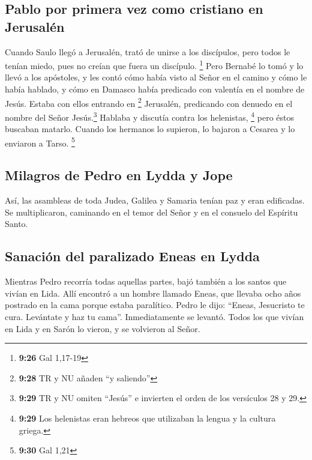 \hypertarget{pablo-por-primera-vez-como-cristiano-en-jerusaluxe9n}{%
\subsection{Pablo por primera vez como cristiano en
Jerusalén}\label{pablo-por-primera-vez-como-cristiano-en-jerusaluxe9n}}

 Cuando Saulo llegó a Jerusalén, trató de unirse a los
discípulos, pero todos le tenían miedo, pues no creían que fuera un
discípulo. \footnote{\textbf{9:26} Gal 1,17-19}  Pero
Bernabé lo tomó y lo llevó a los apóstoles, y les contó cómo había visto
al Señor en el camino y cómo le había hablado, y cómo en Damasco había
predicado con valentía en el nombre de Jesús.  Estaba con
ellos entrando en \footnote{\textbf{9:28} TR y NU añaden ``y saliendo''}
Jerusalén,  predicando con denuedo en el nombre del Señor
Jesús.\footnote{\textbf{9:29} TR y NU omiten ``Jesús'' e invierten el
  orden de los versículos 28 y 29.} Hablaba y discutía contra los
helenistas, \footnote{\textbf{9:29} Los helenistas eran hebreos que
  utilizaban la lengua y la cultura griega.} pero éstos buscaban
matarlo.  Cuando los hermanos lo supieron, lo bajaron a
Cesarea y lo enviaron a Tarso. \footnote{\textbf{9:30} Gal 1,21}

\hypertarget{milagros-de-pedro-en-lydda-y-jope}{%
\subsection{Milagros de Pedro en Lydda y
Jope}\label{milagros-de-pedro-en-lydda-y-jope}}

 Así, las asambleas de toda Judea, Galilea y Samaria
tenían paz y eran edificadas. Se multiplicaron, caminando en el temor
del Señor y en el consuelo del Espíritu Santo.

\hypertarget{sanaciuxf3n-del-paralizado-eneas-en-lydda}{%
\subsection{Sanación del paralizado Eneas en
Lydda}\label{sanaciuxf3n-del-paralizado-eneas-en-lydda}}

 Mientras Pedro recorría todas aquellas partes, bajó
también a los santos que vivían en Lida.  Allí encontró a
un hombre llamado Eneas, que llevaba ocho años postrado en la cama
porque estaba paralítico.  Pedro le dijo: ``Eneas,
Jesucristo te cura. Levántate y haz tu cama''. Inmediatamente se
levantó.  Todos los que vivían en Lida y en Sarón lo
vieron, y se volvieron al Señor.

